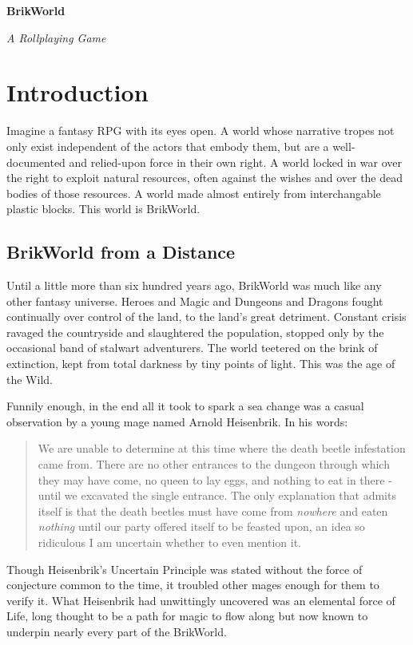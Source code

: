 \documentclass[12pt,a4paper,twocolumn]{article}
\begin{document}

\setlength{\parindent}{0mm}
\setlength{\parskip}{0.5 cm} 

\begin{titlepage}
\Large
{\center \bf BrikWorld}

\normalfont
\begin{flushright}
  {\em A Rollplaying Game}
\end{flushright}
\vspace{1cm}
\end{titlepage}

\normalsize
\section{Introduction}
Imagine a fantasy RPG with its eyes open.  A world whose narrative tropes not only exist independent of the actors that embody them, but are a well-documented and relied-upon force in their own right.  A world locked in war over the right to exploit natural resources, often against the wishes and over the dead bodies of those resources.  A world made almost entirely from interchangable plastic blocks.  This world is BrikWorld. 
\subsection{BrikWorld from a Distance}
Until a little more than six hundred years ago, BrikWorld was much like any other fantasy universe.  Heroes and Magic and Dungeons and Dragons fought continually over control of the land, to the land's great detriment.  Constant crisis ravaged the countryside and slaughtered the population, stopped only by the occasional band of stalwart adventurers.  The world teetered on the brink of extinction, kept from total darkness by tiny points of light.  This was the age of the Wild.

Funnily enough, in the end all it took to spark a sea change was a casual observation by a young mage named Arnold Heisenbrik.  In his words:
\begin{quote}
We are unable to determine at this time where the death beetle infestation came from.  There are no other entrances to the dungeon through which they may have come, no queen to lay eggs, and nothing to eat in there - until we excavated the single entrance.  The only explanation that admits itself is that the death beetles must have come from {\em nowhere} and eaten {\em nothing} until our party offered itself to be feasted upon, an idea so ridiculous I am uncertain whether to even mention it.
\end{quote}
Though Heisenbrik's Uncertain Principle was stated without the force of conjecture common to the time, it troubled other mages enough for them to verify it.  What Heisenbrik had unwittingly uncovered was an elemental force of Life, long thought to be a path for magic to flow along but now known to underpin nearly every part of the BrikWorld.
\end{document}
